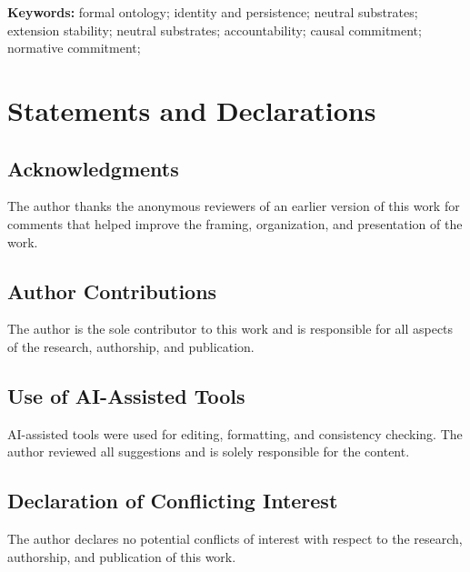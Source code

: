 \documentclass[11pt]{article}
\theoremstyle{plain}
\theoremstyle{definition}
\theoremstyle{remark}
\providecommand{\keywords}[1]{\textbf{Keywords: } #1}
\begin{document}
\keywords{
  formal ontology;
  identity and persistence;
  neutral substrates;
  extension stability;
  neutral substrates;
  accountability;
  causal commitment;
  normative commitment;
}



























\section*{Statements and Declarations}

\subsection*{Acknowledgments} The author thanks the anonymous reviewers
of an earlier version of this work for comments that helped improve
the framing, organization, and presentation of the work.

\subsection*{Author Contributions}
The author is the sole contributor to this work and
is responsible for all aspects of the research, authorship, and publication.

\subsection*{Use of AI-Assisted Tools}
AI-assisted tools were used for editing, formatting, and consistency checking.
The author reviewed all suggestions and is solely responsible for the content.

\subsection*{Declaration of Conflicting Interest}
The author declares no potential conflicts of interest with respect to the
research, authorship, and publication of this work.

\appendix
\clearpage



\end{document}
